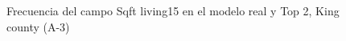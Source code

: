 \begin{figure}[H]
    \centering
    
    \caption{Frecuencia del campo Sqft living15 en el modelo real y Top 2, King county (A-3)}
    \label{frecuency-top2-sqft living15}
\end{figure}